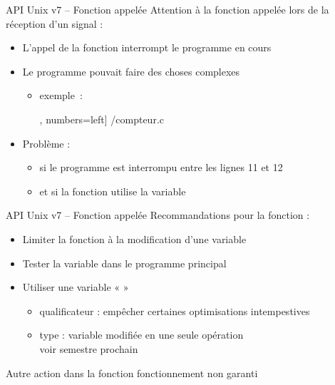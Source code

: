 \begin {frame} {API Unix v7 -- Fonction appelée}
    Attention à la fonction appelée lors de la réception d'un signal :

    \begin {itemize}
	\item L'appel de la fonction interrompt le programme en
	    cours
	\item Le programme pouvait faire des choses complexes

	    \begin {itemize}
		\item exemple~:

		    \fE\lstmonstyle, numbers=left] {\inc/compteur.c}
	    \end {itemize}

	\item Problème :
	    \begin {itemize}
		\item si le programme est interrompu entre les lignes 11 et 12
		\item et si la fonction utilise la variable 
	    \end {itemize}
    \end {itemize}
\end {frame}

\begin {frame} {API Unix v7 -- Fonction appelée}
    Recommandations pour la fonction :

    \begin {itemize}
	\item Limiter la fonction à la modification d'une variable
	\item Tester la variable dans le programme principal
	\item Utiliser une variable «  »
	    \begin {itemize}
		\item qualificateur  : empêcher
		    certaines optimisations intempestives
		\item type  : variable modifiée
		    en une seule opération
		    \\
		    \implique voir semestre prochain
	    \end {itemize}
    \end {itemize}

    \vspace* {3mm}

    Autre action dans la fonction \implique fonctionnement
    non garanti
\end {frame}

